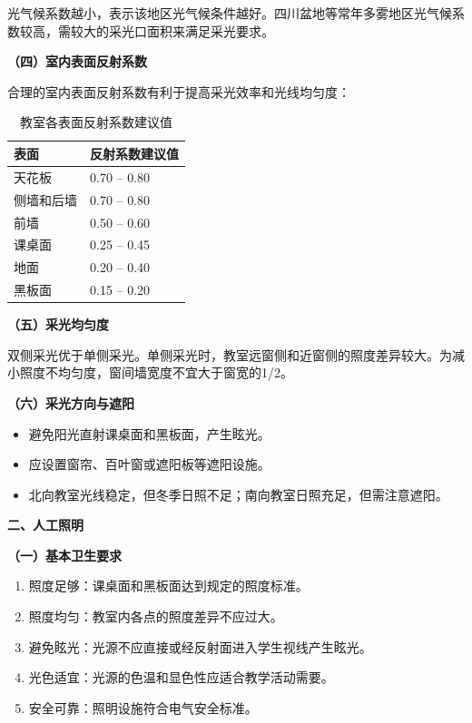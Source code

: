 \begin{keybox}
光气候系数越小，表示该地区光气候条件越好。四川盆地等常年多雾地区光气候系数较高，需较大的采光口面积来满足采光要求。

\textbf{（四）室内表面反射系数}

合理的室内表面反射系数有利于提高采光效率和光线均匀度：

\begin{table}[H]
\centering
\caption{教室各表面反射系数建议值}
\begin{tabularx}{\textwidth}{lX}
\hline
\textbf{表面} & \textbf{反射系数建议值} \\
\hline
天花板 & 0.70 -- 0.80 \\
侧墙和后墙 & 0.70 -- 0.80 \\
前墙 & 0.50 -- 0.60 \\
课桌面 & 0.25 -- 0.45 \\
地面 & 0.20 -- 0.40 \\
黑板面 & 0.15 -- 0.20 \\
\hline
\end{tabularx}
\end{table}

\textbf{（五）采光均匀度}

双侧采光优于单侧采光。单侧采光时，教室远窗侧和近窗侧的照度差异较大。为减小照度不均匀度，窗间墙宽度不宜大于窗宽的1/2。

\textbf{（六）采光方向与遮阳}

\begin{itemize}[leftmargin=*]
    \item 避免阳光直射课桌面和黑板面，产生眩光。
    \item 应设置窗帘、百叶窗或遮阳板等遮阳设施。
    \item 北向教室光线稳定，但冬季日照不足；南向教室日照充足，但需注意遮阳。
\end{itemize}

\textbf{二、人工照明}

\textbf{（一）基本卫生要求}

\begin{enumerate}[leftmargin=*]
    \item 照度足够：课桌面和黑板面达到规定的照度标准。
    \item 照度均匀：教室内各点的照度差异不应过大。
    \item 避免眩光：光源不应直接或经反射面进入学生视线产生眩光。
    \item 光色适宜：光源的色温和显色性应适合教学活动需要。
    \item 安全可靠：照明设施符合电气安全标准。
\end{enumerate}


\end{keybox}

